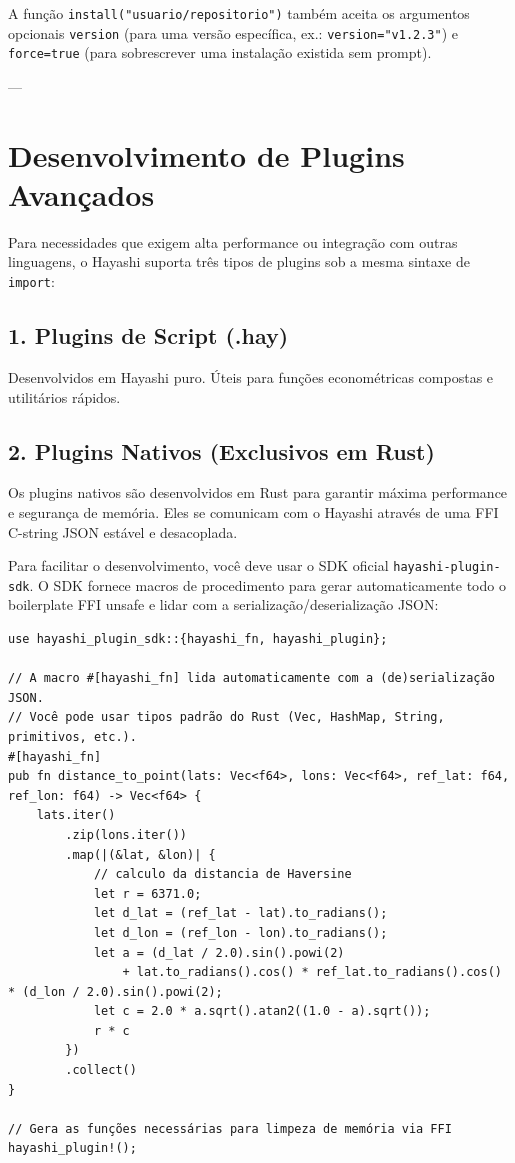 A função \lstinline{install("usuario/repositorio")} também aceita os argumentos opcionais \lstinline{version} (para uma versão específica, ex.: \lstinline{version="v1.2.3"}) e \lstinline{force=true} (para sobrescrever uma instalação existida sem prompt).

---

\section{Desenvolvimento de Plugins Avançados}

Para necessidades que exigem alta performance ou integração com outras linguagens, o Hayashi suporta três tipos de plugins sob a mesma sintaxe de \lstinline{import}:

\subsection{1. Plugins de Script (.hay)}
Desenvolvidos em Hayashi puro. Úteis para funções econométricas compostas e utilitários rápidos.

\subsection{2. Plugins Nativos (Exclusivos em Rust)}
Os plugins nativos são desenvolvidos em Rust para garantir máxima performance e segurança de memória. Eles se comunicam com o Hayashi através de uma FFI C-string JSON estável e desacoplada.

Para facilitar o desenvolvimento, você deve usar o SDK oficial \texttt{hayashi-plugin-sdk}. O SDK fornece macros de procedimento para gerar automaticamente todo o boilerplate FFI unsafe e lidar com a serialização/deserialização JSON:

\begin{lstlisting}[caption={Desenvolvendo um plugin nativo usando o SDK}]
use hayashi_plugin_sdk::{hayashi_fn, hayashi_plugin};

// A macro #[hayashi_fn] lida automaticamente com a (de)serialização JSON.
// Você pode usar tipos padrão do Rust (Vec, HashMap, String, primitivos, etc.).
#[hayashi_fn]
pub fn distance_to_point(lats: Vec<f64>, lons: Vec<f64>, ref_lat: f64, ref_lon: f64) -> Vec<f64> {
    lats.iter()
        .zip(lons.iter())
        .map(|(&lat, &lon)| {
            // calculo da distancia de Haversine
            let r = 6371.0;
            let d_lat = (ref_lat - lat).to_radians();
            let d_lon = (ref_lon - lon).to_radians();
            let a = (d_lat / 2.0).sin().powi(2)
                + lat.to_radians().cos() * ref_lat.to_radians().cos() * (d_lon / 2.0).sin().powi(2);
            let c = 2.0 * a.sqrt().atan2((1.0 - a).sqrt());
            r * c
        })
        .collect()
}

// Gera as funções necessárias para limpeza de memória via FFI
hayashi_plugin!();
\end{lstlisting}

